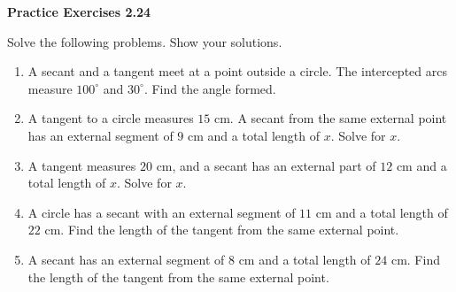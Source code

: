 \vspace{0.3ex}
\noindent\textbf{Practice Exercises 2.24}

\vspace{0.2ex}

Solve the following problems. Show your solutions.

\begin{enumerate}
    \item A secant and a tangent meet at a point outside a circle. The intercepted arcs measure $100^\circ$ and $30^\circ$. Find the angle formed.
    \item A tangent to a circle measures $15$ cm. A secant from the same external point has an external segment of $9$ cm and a total length of $x$. Solve for $x$.
    \item A tangent measures $20$ cm, and a secant has an external part of $12$ cm and a total length of $x$. Solve for $x$.
    \item A circle has a secant with an external segment of $11$ cm and a total length of $22$ cm. Find the length of the tangent from the same external point.
    \item A secant has an external segment of $8$ cm and a total length of $24$ cm. Find the length of the tangent from the same external point.
\end{enumerate}
